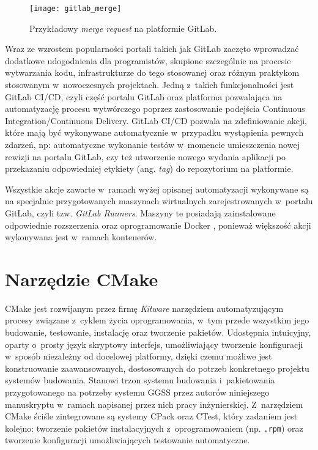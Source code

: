 \begin{figure}[H]
    \centering
    \texttt{[image: gitlab\_merge]}
    \caption{Przykładowy \emph{merge request} na platformie GitLab.}
    \label{fig:merge}
\end{figure}

Wraz ze wzrostem popularności portali takich jak GitLab zaczęto wprowadzać dodatkowe udogodnienia dla programistów, skupione szczególnie na procesie wytwarzania kodu, infrastrukturze do tego stosowanej oraz różnym praktykom stosowanym w~nowoczesnych projektach. Jedną z~takich funkcjonalności jest GitLab CI/CD, czyli część portalu GitLab oraz platforma pozwalająca na automatyzację procesu wytwórczego poprzez zastosowanie podejścia Continuous Integration/Continuous Delivery. GitLab CI/CD pozwala na zdefiniowanie akcji, które mają być wykonywane automatycznie w~przypadku wystąpienia pewnych zdarzeń, np: automatyczne wykonanie testów w~momencie umieszczenia nowej rewizji na portalu GitLab, czy też utworzenie nowego wydania aplikacji po przekazaniu odpowiedniej etykiety (ang. \emph{tag}) do repozytorium na platformie.

Wszystkie akcje zawarte w~ramach wyżej opisanej automatyzacji wykonywane są na specjalnie przygotowanych maszynach wirtualnych zarejestrowanych w~portalu GitLab, czyli tzw. \emph{GitLab Runners}. Maszyny te posiadają zainstalowane odpowiednie rozszerzenia oraz oprogramowanie Docker \cite{docker_main}, ponieważ większość akcji wykonywana jest w~ramach kontenerów.


\section{Narzędzie CMake}
CMake jest rozwijanym przez firmę \emph{Kitware} narzędziem automatyzującym procesy związane z~cyklem życia oprogramowania, w~tym przede wszystkim jego budowanie, testowanie, instalację oraz tworzenie pakietów. Udostępnia intuicyjny, oparty o~prosty język skryptowy interfejs, umożliwiający tworzenie konfiguracji w~sposób niezależny od docelowej platformy, dzięki czemu możliwe jest konstruowanie zaawansowanych, dostosowanych do potrzeb konkretnego projektu systemów budowania. Stanowi trzon systemu budowania i~pakietowania przygotowanego na potrzeby systemu GGSS przez autorów niniejszego manuskryptu w~ramach napisanej przez nich pracy inżynierskiej. Z~narzędziem CMake ściśle zintegrowane są systemy CPack oraz CTest, który zadaniem jest kolejno: tworzenie pakietów instalacyjnych z~oprogramowaniem (np. \lstinline{.rpm}) oraz tworzenie konfiguracji umożliwiających testowanie automatyczne.

